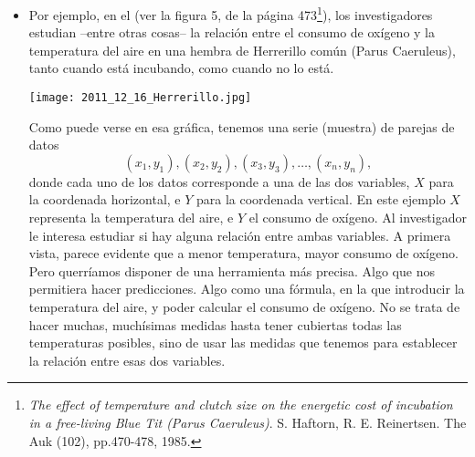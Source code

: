 \begin{itemize}

    \item Por ejemplo, en el  (ver la figura 5, de la página 473\footnote{{\em The effect of temperature and clutch size on the energetic cost of incubation in a free-living Blue Tit (Parus Caeruleus)}. S. Haftorn, R. E. Reinertsen. The Auk (102), pp.470-478, 1985.}), los investigadores estudian --entre otras cosas-- la relación entre el consumo de oxígeno y la temperatura del aire en una hembra de Herrerillo común (Parus Caeruleus), tanto cuando está incubando, como cuando no lo está.
        \begin{center}
        \texttt{[image: 2011\_12\_16\_Herrerillo.jpg]}
        \end{center}
        Como puede verse en esa gráfica, tenemos una serie (muestra) de {\sf parejas} de datos
        \[(x_1,y_1),(x_2,y_2),(x_3,y_3),\ldots,(x_n,y_n),\]
        donde cada uno de los datos corresponde a una de las dos variables, $X$ para la coordenada horizontal, e $Y$ para la coordenada vertical. En este ejemplo $X$ representa la temperatura del aire, e $Y$ el consumo de oxígeno. Al investigador le interesa estudiar si hay alguna relación entre ambas variables. A primera vista, parece evidente que a menor temperatura, mayor consumo de oxígeno. Pero querríamos disponer de una herramienta más precisa. Algo que nos permitiera hacer predicciones. Algo como una fórmula, en la que introducir la temperatura del aire, y poder calcular el consumo de oxígeno. No se trata de hacer muchas, muchísimas medidas hasta tener cubiertas todas las temperaturas posibles, sino de usar las medidas que tenemos para establecer la relación entre esas dos variables.



\end{itemize}
